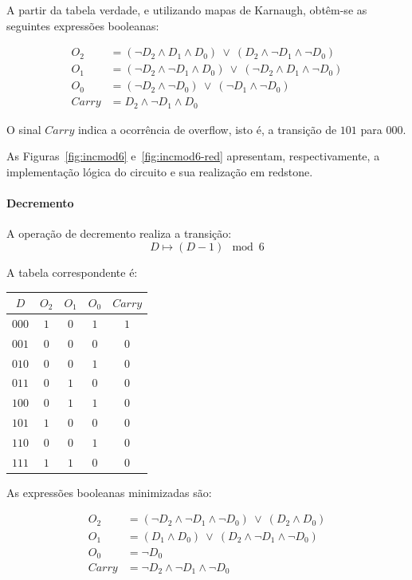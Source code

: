 \documentclass[a4paper,12pt]{article}
\begin{document}
A partir da tabela verdade, e utilizando mapas de Karnaugh, obtêm-se as seguintes expressões booleanas:

\begin{align*}
O_2 &= (\lnot D_2 \land D_1 \land D_0)\ \lor\ (D_2 \land \lnot D_1 \land \lnot D_0) \\
O_1 &= (\lnot D_2 \land \lnot D_1 \land D_0)\ \lor\ (\lnot D_2 \land D_1 \land \lnot D_0) \\
O_0 &= (\lnot D_2 \land \lnot D_0)\ \lor\ (\lnot D_1 \land \lnot D_0) \\
Carry &= D_2 \land \lnot D_1 \land D_0
\end{align*}

O sinal $Carry$ indica a ocorrência de overflow, isto é, a transição de $101$ para $000$.

As Figuras~\ref{fig:incmod6} e~\ref{fig:incmod6-red} apresentam, respectivamente, a implementação lógica do circuito e sua realização em redstone.

\paragraph{Decremento}

A operação de decremento realiza a transição:
\[
D \mapsto (D - 1) \mod 6
\]

A tabela correspondente é:

\begin{center}
\begin{tabular}{c|cccc}
$D$ & $O_2$ & $O_1$ & $O_0$ & $Carry$\\
\hline
$000$ & $1$ & $0$ & $1$ & $1$\\
$001$ & $0$ & $0$ & $0$ & $0$\\
$010$ & $0$ & $0$ & $1$ & $0$\\
$011$ & $0$ & $1$ & $0$ & $0$\\
$100$ & $0$ & $1$ & $1$ & $0$\\
$101$ & $1$ & $0$ & $0$ & $0$\\
$110$ & $0$ & $0$ & $1$ & $0$\\
$111$ & $1$ & $1$ & $0$ & $0$\\
\end{tabular}
\end{center}

As expressões booleanas minimizadas são:

\begin{align*}
O_2 &= (\lnot D_2 \land \lnot D_1 \land \lnot D_0)\ \lor\ (D_2 \land D_0) \\
O_1 &= (D_1 \land D_0)\ \lor\ (D_2 \land \lnot D_1 \land \lnot D_0) \\
O_0 &= \lnot D_0 \\
Carry &= \lnot D_2 \land \lnot D_1 \land \lnot D_0
\end{align*}
\end{document}

